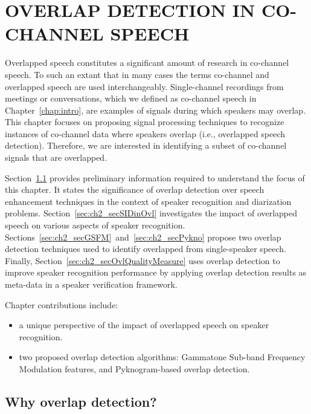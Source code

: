 

\chapter{OVERLAP DETECTION IN CO-CHANNEL SPEECH}
 
Overlapped speech constitutes a significant amount of research in co-channel speech. 
To such an extant that in many cases the terms co-channel and overlapped speech are used interchangeably. Single-channel recordings from meetings or conversations, which we defined as co-channel speech in Chapter~\ref{chap:intro}, are examples of signals during which speakers may overlap. 
This chapter focuses on proposing signal processing techniques to recognize instances of co-channel data where speakers overlap (i.e., overlapped speech detection). Therefore, we are interested in identifying a subset of co-channel signals that are overlapped. 

Section~\ref{sec:ch2_secBackground} provides preliminary information required to understand the focus of this chapter. It states the significance of overlap detection over speech enhancement techniques in the context of speaker recognition and diarization problems. 
Section~\ref{sec:ch2_secSIDinOvl} investigates the impact of overlapped speech on various aspects of speaker recognition. 
Sections~\ref{sec:ch2_secGSFM}~and~\ref{sec:ch2_secPykno} propose two overlap detection techniques used to identify overlapped from single-speaker speech. 
Finally, Section~\ref{sec:ch2_secOvlQualityMeasure} uses overlap detection to improve speaker recognition performance by applying overlap detection results as meta-data in a speaker verification framework. 

Chapter contributions include: 
\begin{itemize}
	\item a unique perspective of the impact of overlapped speech on speaker recognition.
	\item two proposed overlap detection algorithms: Gammatone Sub-band Frequency Modulation features, and Pyknogram-based overlap detection.
\end{itemize}
\section{Why overlap detection?}
\label{sec:ch2_secBackground}

